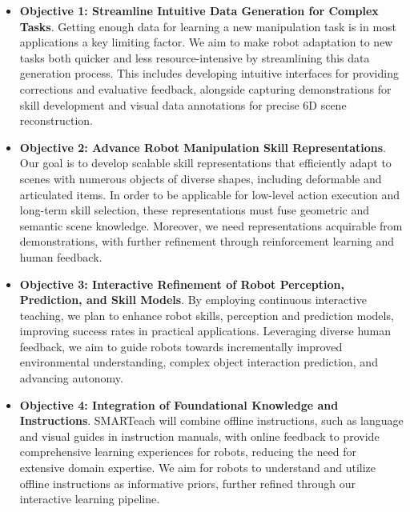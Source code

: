 \documentclass{erc-B2}
\begin{document}
\begin{itemize}
    \item  \textbf{Objective 1: Streamline Intuitive Data Generation for Complex Tasks}. Getting enough data for learning a new manipulation task is in most applications a key limiting factor. We aim to make robot adaptation to new tasks both quicker and less resource-intensive by streamlining this data generation process. This includes developing intuitive interfaces for providing corrections and evaluative feedback, alongside capturing demonstrations for skill development and visual data annotations for precise 6D scene reconstruction. 

    \item \textbf{Objective 2: Advance Robot Manipulation Skill Representations}. Our goal is to develop scalable skill representations that efficiently adapt to scenes with numerous objects of diverse shapes, including deformable and articulated items. In order to be applicable for low-level action execution and long-term skill selection, these representations must fuse geometric and semantic scene knowledge. Moreover, we need representations acquirable from demonstrations, with further refinement through reinforcement learning and human feedback.

    \item \textbf{Objective 3: Interactive Refinement of Robot Perception, Prediction, and Skill Models}. By employing continuous interactive teaching, we plan to enhance robot skills, perception  and prediction models, improving success rates in practical applications. Leveraging diverse human feedback, we aim to guide robots towards incrementally improved environmental understanding, complex object interaction prediction, and advancing autonomy.

    \item \textbf{Objective 4: Integration of Foundational Knowledge and Instructions}. SMARTeach will combine offline instructions, such as language and visual guides in instruction manuals, with online feedback to provide comprehensive learning experiences for robots, reducing the need for extensive domain expertise. We aim for robots to understand and utilize offline instructions as informative priors, further refined through our interactive learning pipeline.


\end{itemize}
\end{document}
